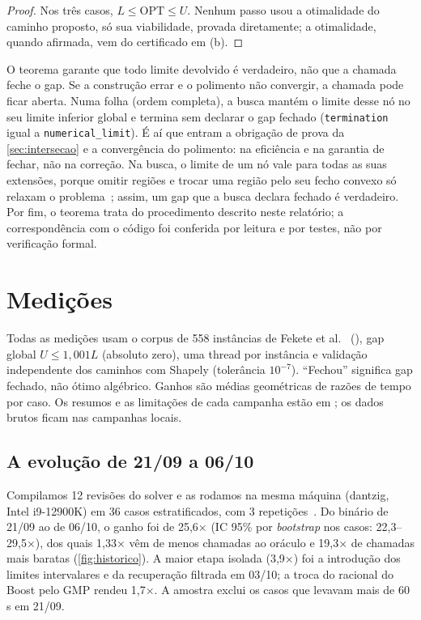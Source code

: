 \documentclass[11pt,a4paper]{article}
\theoremstyle{plain}\newtheorem{proposicao}{Proposição}
\theoremstyle{definition}\newtheorem{definicao}{Definição}
\theoremstyle{plain}\newtheorem{teorema}{Teorema}
\newcommand{\OPT}{\mathrm{OPT}}
\newcommand{\code}[1]{\texttt{\small #1}}
\begin{document}
\begin{proof}
Nos três casos, \(L\le\OPT\le U\). Nenhum passo usou a otimalidade do caminho proposto, só sua viabilidade, provada diretamente; a otimalidade, quando afirmada, vem do certificado em (b).
\end{proof}

O teorema garante que todo limite devolvido é verdadeiro, não que a chamada feche o gap. Se a construção errar e o polimento não convergir, a chamada pode ficar aberta. Numa folha (ordem completa), a busca mantém o limite desse nó no seu limite inferior global e termina sem declarar o gap fechado (\code{termination} igual a \code{numerical\_limit}). É aí que entram a obrigação de prova da \cref{sec:intersecao} e a convergência do polimento: na eficiência e na garantia de fechar, não na correção. Na busca, o limite de um nó vale para todas as suas extensões, porque omitir regiões e trocar uma região pelo seu fecho convexo só relaxam o problema~\cite{ordemlivre}; assim, um gap que a busca declara fechado é verdadeiro. Por fim, o teorema trata do procedimento descrito neste relatório; a correspondência com o código foi conferida por leitura e por testes, não por verificação formal.

\section{Medições}\label{sec:medicoes}
Todas as medições usam o corpus de 558 instâncias de Fekete et al.~\cite{fekete} (), gap global \(U\le1{,}001L\) (absoluto zero), uma thread por instância e validação independente dos caminhos com Shapely (tolerância \(10^{-7}\)). ``Fechou'' significa gap fechado, não ótimo algébrico. Ganhos são médias geométricas de razões de tempo por caso. Os resumos e as limitações de cada campanha estão em ; os dados brutos ficam nas campanhas locais.

\subsection{A evolução de 21/09 a 06/10}
Compilamos 12 revisões do solver e as rodamos na mesma máquina (dantzig, Intel i9-12900K) em 36 casos estratificados, com 3 repetições~\cite{historico}. Do binário de 21/09 ao de 06/10, o ganho foi de 25,6× (IC 95\% por \emph{bootstrap} nos casos: 22,3–29,5×), dos quais 1,33× vêm de menos chamadas ao oráculo e 19,3× de chamadas mais baratas (\cref{fig:historico}). A maior etapa isolada (3,9×) foi a introdução dos limites intervalares e da recuperação filtrada em 03/10; a troca do racional do Boost pelo GMP rendeu 1,7×. A amostra exclui os casos que levavam mais de 60 s em 21/09.
\end{document}

